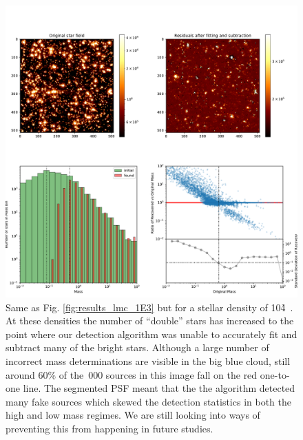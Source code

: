 \begin{appendix}
\begin{figure}

    \centering
    \includegraphics[width=\textwidth]{images/tbl_stats_dist=50000_rho=10000.pdf}
    \caption{Same as Fig. \ref{fig:results_lmc_1E3} but for a stellar density of 10\h4~\spa. At these densities the number of ``double'' stars has increased to the point where our detection algorithm was unable to accurately fit and subtract many of the bright stars. Although a large number of incorrect mass determinations are visible in the big blue cloud, still around 60\% of the \,000 sources in this image fall on the red one-to-one line. The segmented PSF meant that the the algorithm detected many fake sources which skewed the detection statistics in both the high and low mass regimes. We are still looking into ways of preventing this from happening in future studies.}
    
    \label{fig:results_lmc_1E4}
    
\end{figure}

\end{appendix}

